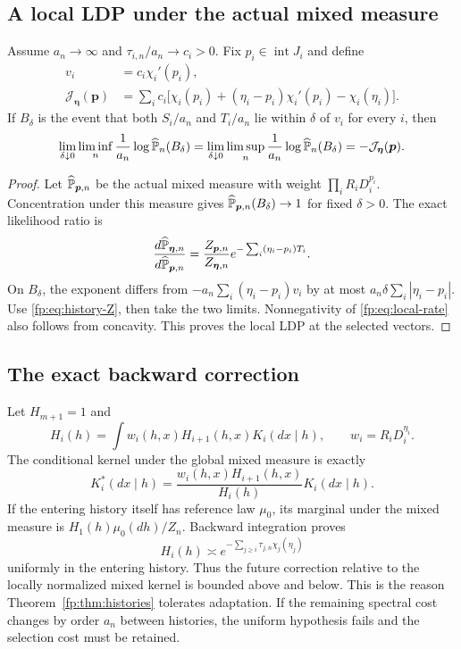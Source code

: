 \subsection{A local LDP under the actual mixed measure}
\begin{theorem}\label{fp:thm:history-local-ldp}
Assume $a_n\to\infty$ and $\tau_{i,n}/a_n\to c_i>0$. Fix $p_i\in\operatorname{int}J_i$ and define
\begin{align}
 v_i&=c_i\chi_i'(p_i),\label{fp:eq:local-v}\\
 \mathcal J_{\boldsymbol\eta}(\boldsymbol p)
 &=\sum_i c_i\bigl[\chi_i(p_i)+(\eta_i-p_i)\chi_i'(p_i)-\chi_i(\eta_i)\bigr].\label{fp:eq:local-rate}
\end{align}
If $B_\delta$ is the event that both $S_i/a_n$ and $T_i/a_n$ lie within $\delta$ of $v_i$ for every $i$, then
\begin{equation}\label{fp:eq:local-ldp}
 \lim_{\delta\downarrow0}\liminf_n\frac1{a_n}\log\widehat{\mathbb P}_n(B_\delta)
 =\lim_{\delta\downarrow0}\limsup_n\frac1{a_n}\log\widehat{\mathbb P}_n(B_\delta)
 =-\mathcal J_{\boldsymbol\eta}(\boldsymbol p).
\end{equation}
\end{theorem}
\begin{proof}
Let $\widehat{\mathbb P}_{\boldsymbol p,n}$ be the actual mixed measure with weight $\prod_iR_iD_i^{p_i}$. Concentration under this measure gives $\widehat{\mathbb P}_{\boldsymbol p,n}(B_\delta)\to1$ for fixed $\delta>0$. The exact likelihood ratio is
\[
 \frac{d\widehat{\mathbb P}_{\boldsymbol\eta,n}}
 {d\widehat{\mathbb P}_{\boldsymbol p,n}}
 =\frac{Z_{\boldsymbol p,n}}{Z_{\boldsymbol\eta,n}}
 e^{-\sum_i(\eta_i-p_i)T_i}.
\]
On $B_\delta$, the exponent differs from $-a_n\sum_i(\eta_i-p_i)v_i$ by at most $a_n\delta\sum_i|\eta_i-p_i|$. Use \eqref{fp:eq:history-Z}, then take the two limits. Nonnegativity of \eqref{fp:eq:local-rate} also follows from concavity. This proves the local LDP at the selected vectors.
\end{proof}

\subsection{The exact backward correction}
Let $H_{m+1}=1$ and
\[
 H_i(h)=\int w_i(h,x)H_{i+1}(h,x)K_i(dx\mid h),
 \qquad w_i=R_iD_i^{\eta_i}.
\]
The conditional kernel under the global mixed measure is exactly
\begin{equation}\label{fp:eq:doob-history}
 K_i^*(dx\mid h)
 =\frac{w_i(h,x)H_{i+1}(h,x)}{H_i(h)}K_i(dx\mid h).
\end{equation}
If the entering history itself has reference law $\mu_0$, its marginal
under the mixed measure is $H_1(h)\mu_0(dh)/Z_n$.
Backward integration proves
\[
 H_i(h)\asymp
 e^{-\sum_{j\ge i}\tau_{j,n}\chi_j(\eta_j)}
\]
uniformly in the entering history. Thus the future correction relative to the locally normalized mixed kernel is bounded above and below. This is the reason Theorem~\ref{fp:thm:histories} tolerates adaptation. If the remaining spectral cost changes by order $a_n$ between histories, the uniform hypothesis fails and the selection cost must be retained.

